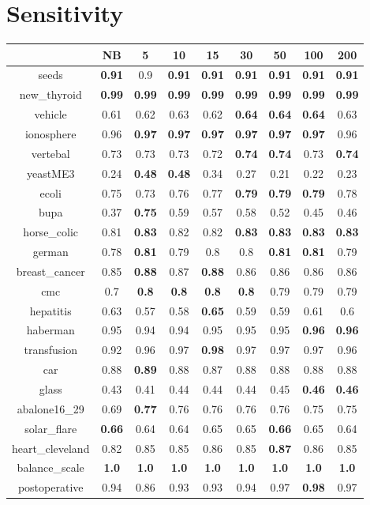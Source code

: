 \documentclass{article}%
\begin{document}
%
\section*{Sensitivity}%
\begin{tabular}{c|cccccccc}%
\hline%
&NB&5&10&15&30&50&100&200\\%
\hline%
seeds&\textbf{0.91}&0.9&\textbf{0.91}&\textbf{0.91}&\textbf{0.91}&\textbf{0.91}&\textbf{0.91}&\textbf{0.91}\\%
new\_thyroid&\textbf{0.99}&\textbf{0.99}&\textbf{0.99}&\textbf{0.99}&\textbf{0.99}&\textbf{0.99}&\textbf{0.99}&\textbf{0.99}\\%
vehicle&0.61&0.62&0.63&0.62&\textbf{0.64}&\textbf{0.64}&\textbf{0.64}&0.63\\%
ionosphere&0.96&\textbf{0.97}&\textbf{0.97}&\textbf{0.97}&\textbf{0.97}&\textbf{0.97}&\textbf{0.97}&0.96\\%
vertebal&0.73&0.73&0.73&0.72&\textbf{0.74}&\textbf{0.74}&0.73&\textbf{0.74}\\%
yeastME3&0.24&\textbf{0.48}&\textbf{0.48}&0.34&0.27&0.21&0.22&0.23\\%
ecoli&0.75&0.73&0.76&0.77&\textbf{0.79}&\textbf{0.79}&\textbf{0.79}&0.78\\%
bupa&0.37&\textbf{0.75}&0.59&0.57&0.58&0.52&0.45&0.46\\%
horse\_colic&0.81&\textbf{0.83}&0.82&0.82&\textbf{0.83}&\textbf{0.83}&\textbf{0.83}&\textbf{0.83}\\%
german&0.78&\textbf{0.81}&0.79&0.8&0.8&\textbf{0.81}&\textbf{0.81}&0.79\\%
breast\_cancer&0.85&\textbf{0.88}&0.87&\textbf{0.88}&0.86&0.86&0.86&0.86\\%
cmc&0.7&\textbf{0.8}&\textbf{0.8}&\textbf{0.8}&\textbf{0.8}&0.79&0.79&0.79\\%
hepatitis&0.63&0.57&0.58&\textbf{0.65}&0.59&0.59&0.61&0.6\\%
haberman&0.95&0.94&0.94&0.95&0.95&0.95&\textbf{0.96}&\textbf{0.96}\\%
transfusion&0.92&0.96&0.97&\textbf{0.98}&0.97&0.97&0.97&0.96\\%
car&0.88&\textbf{0.89}&0.88&0.87&0.88&0.88&0.88&0.88\\%
glass&0.43&0.41&0.44&0.44&0.44&0.45&\textbf{0.46}&\textbf{0.46}\\%
abalone16\_29&0.69&\textbf{0.77}&0.76&0.76&0.76&0.76&0.75&0.75\\%
solar\_flare&\textbf{0.66}&0.64&0.64&0.65&0.65&\textbf{0.66}&0.65&0.64\\%
heart\_cleveland&0.82&0.85&0.85&0.86&0.85&\textbf{0.87}&0.86&0.85\\%
balance\_scale&\textbf{1.0}&\textbf{1.0}&\textbf{1.0}&\textbf{1.0}&\textbf{1.0}&\textbf{1.0}&\textbf{1.0}&\textbf{1.0}\\%
postoperative&0.94&0.86&0.93&0.93&0.94&0.97&\textbf{0.98}&0.97\\%
\end{tabular}
\end{document}
